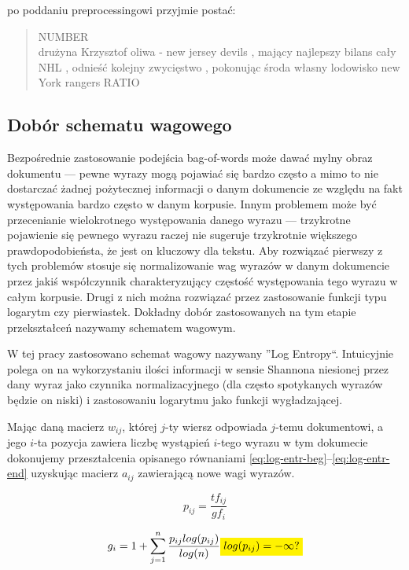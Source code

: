 \documentclass[11pt,a4paper]{article}
\newcommand{\todo}[1]{\colorbox{yellow}{#1}}
\begin{document}
po poddaniu preprocessingowi przyjmie postać:

\begin{quote}
NUMBER\\
drużyna Krzysztof oliwa - new jersey devils , mający najlepszy bilans
cały NHL , odnieść kolejny zwycięstwo , pokonując środa własny lodowisko new
York rangers RATIO 
\end{quote}

\subsection{Dobór schematu wagowego}

Bezpośrednie zastosowanie podejścia bag-of-words może dawać mylny obraz
dokumentu --- pewne wyrazy mogą pojawiać się bardzo często a mimo to nie
dostarczać żadnej pożytecznej informacji o danym dokumencie ze względu na fakt
występowania bardzo często w danym korpusie. Innym problemem może być
przecenianie wielokrotnego występowania danego wyrazu --- trzykrotne pojawienie
się pewnego wyrazu raczej nie sugeruje trzykrotnie większego prawdopodobieństa,
że jest on kluczowy dla tekstu. Aby rozwiązać pierwszy z tych problemów stosuje
się normalizowanie wag wyrazów w danym dokumencie przez jakiś współczynnik
charakteryzujący częstość występowania tego wyrazu w całym korpusie. Drugi z
nich można rozwiązać przez zastosowanie funkcji typu logarytm czy pierwiastek.
Dokładny dobór zastosowanych na tym etapie przekształceń nazywamy schematem
wagowym.

W tej pracy zastosowano schemat wagowy nazywany ''Log Entropy``.  Intuicyjnie
polega on na wykorzystaniu ilości informacji w sensie Shannona niesionej przez
dany wyraz jako czynnika normalizacyjnego (dla często spotykanych wyrazów
będzie on niski) i zastosowaniu logarytmu jako funkcji wygładzającej.

Mając daną macierz $w_{ij}$, której $j$-ty wiersz odpowiada $j$-temu
dokumentowi, a jego $i$-ta pozycja zawiera liczbę wystąpień $i$-tego wyrazu w
tym dokumecie dokonujemy przeształcenia opisanego równaniami
\ref{eq:log-entr-beg}--\ref{eq:log-entr-end} uzyskując macierz $a_{ij}$
zawierającą nowe wagi wyrazów.

\begin{equation}
  \label{eq:log-entr-beg}
  p_{ij} = \frac{tf_{ij}}{gf_i}
\end{equation}

\begin{equation}
  g_i = 1 + \sum_{j=1}^n \frac{p_{ij} log(p_{ij})}{log(n)}
  \todo{$log(p_{ij}) = -\infty?$}
\end{equation}
\end{document}
